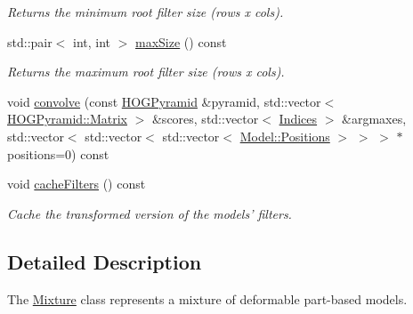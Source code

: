 \begin{DoxyCompactItemize}
\begin{DoxyCompactList}\small\item\em Returns the minimum root filter size ({\ttfamily rows x cols}). \end{DoxyCompactList}\item 
\hypertarget{class_f_f_l_d_1_1_mixture_aa77b2466124a3faf4331491f8da0647e}{std\-::pair$<$ int, int $>$ \hyperlink{class_f_f_l_d_1_1_mixture_aa77b2466124a3faf4331491f8da0647e}{max\-Size} () const }\label{class_f_f_l_d_1_1_mixture_aa77b2466124a3faf4331491f8da0647e}

\begin{DoxyCompactList}\small\item\em Returns the maximum root filter size ({\ttfamily rows x cols}). \end{DoxyCompactList}\item 
void \hyperlink{class_f_f_l_d_1_1_mixture_a912fa512d1a234a51d2738640f902a4e}{convolve} (const \hyperlink{class_f_f_l_d_1_1_h_o_g_pyramid}{H\-O\-G\-Pyramid} \&pyramid, std\-::vector$<$ \hyperlink{class_f_f_l_d_1_1_h_o_g_pyramid_a2618b4bd5d17f05cdc108189ed5abe3a}{H\-O\-G\-Pyramid\-::\-Matrix} $>$ \&scores, std\-::vector$<$ \hyperlink{class_f_f_l_d_1_1_mixture_a31d98d583481cbd0d8c302dae0ab3421}{Indices} $>$ \&argmaxes, std\-::vector$<$ std\-::vector$<$ std\-::vector$<$ \hyperlink{class_f_f_l_d_1_1_model_ac0493e10c6cde7f65bd6244fdb679ea3}{Model\-::\-Positions} $>$ $>$ $>$ $\ast$positions=0) const 
\item 
\hypertarget{class_f_f_l_d_1_1_mixture_aafa8e98dfd20254bbe41ade348e4e635}{void \hyperlink{class_f_f_l_d_1_1_mixture_aafa8e98dfd20254bbe41ade348e4e635}{cache\-Filters} () const }\label{class_f_f_l_d_1_1_mixture_aafa8e98dfd20254bbe41ade348e4e635}

\begin{DoxyCompactList}\small\item\em Cache the transformed version of the models' filters. \end{DoxyCompactList}\end{DoxyCompactItemize}


\subsection{Detailed Description}
The \hyperlink{class_f_f_l_d_1_1_mixture}{Mixture} class represents a mixture of deformable part-\/based models. 

